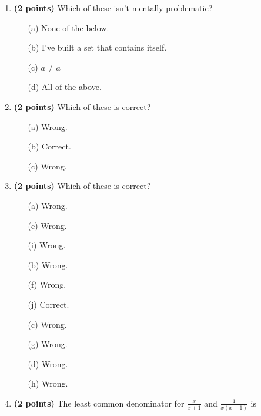 \documentclass[12pt]{amsart}
\begin{document}
\newpage
\begin{enumerate}
\item {\bf (2 points)} 
 Which of these isn't mentally problematic?

\begin{minipage}[t]{1.0\linewidth}\begin{itemize}\item[(a)]  None of the below.  \item[(b)]  I've built a set that contains itself. \item[(c)]  $a \neq a$ \item[(d)]   All of the above. \end{itemize}\end{minipage} \vfill 
\item {\bf (2 points)} 
 Which of these is correct?

\begin{minipage}[t]{1.0\linewidth}\begin{multicols}{3}\begin{itemize}\item[(a)]  Wrong. \item[(b)]  Correct. \item[(c)]  Wrong. \end{itemize}\end{multicols}\end{minipage} \vfill 
\item {\bf (2 points)} 
 Which of these is correct?

\begin{minipage}[t]{1.0\linewidth}\begin{multicols}{4}\begin{itemize}\item[(a)]  Wrong. \item[(e)]  Wrong. \item[(i)]  Wrong. \item[(b)]  Wrong. \item[(f)]  Wrong. \item[(j)]  Correct. \item[(c)]  Wrong. \item[(g)]  Wrong. \item[] \item[(d)]  Wrong. \item[(h)]  Wrong. \item[] \end{itemize}\end{multicols}\end{minipage} \vfill 
\item {\bf (2 points)} 
 The least common denominator for $\displaystyle \frac{x}{x+1}$ and $\displaystyle \frac{1}{x(x-1)}$ is \vspace{.2cm}


\end{enumerate}
\end{document}
